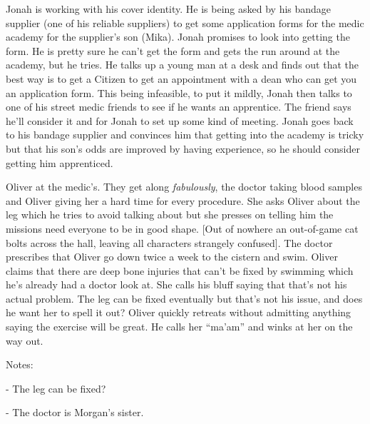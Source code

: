 
Jonah is working with his cover identity.  He is being asked by his bandage supplier (one of his reliable suppliers) to get some application forms for the medic academy for the supplier's son (Mika).  Jonah promises to look into getting the form.  He is pretty sure he can't get the form and gets the run around at the academy, but he tries.  He talks up a young man at a desk and finds out that the best way is to get a Citizen to get an appointment with a dean who can get you an application form.  This being infeasible, to put it mildly, Jonah then talks to one of his street medic friends to see if he wants an apprentice.  The friend says he'll consider it and for Jonah to set up some kind of meeting.  Jonah goes back to his bandage supplier and convinces him that getting into the academy is tricky but that his son's odds are improved by having experience, so he should consider getting him apprenticed.






Oliver at the medic's.  They get along \textit{fabulously}, the doctor taking blood samples and Oliver giving her a hard time for every procedure.  She asks Oliver about the leg which he tries to avoid talking about but she presses on telling him the missions need everyone to be in good shape.  {[}Out of nowhere an out-of-game cat bolts across the hall, leaving all characters strangely confused{]}.  The doctor prescribes that Oliver go down twice a week to the cistern and swim.  Oliver claims that there are deep bone injuries that can't be fixed by swimming which he's already had a doctor look at.  She calls his bluff saying that that's not his actual problem.  The leg can be fixed eventually but that's not his issue, and does he want her to spell it out?  Oliver quickly retreats without admitting anything saying the exercise will be great.  He calls her ``ma'am'' and winks at her on the way out.



Notes:

- The leg can be fixed?

- The doctor is Morgan's sister.



